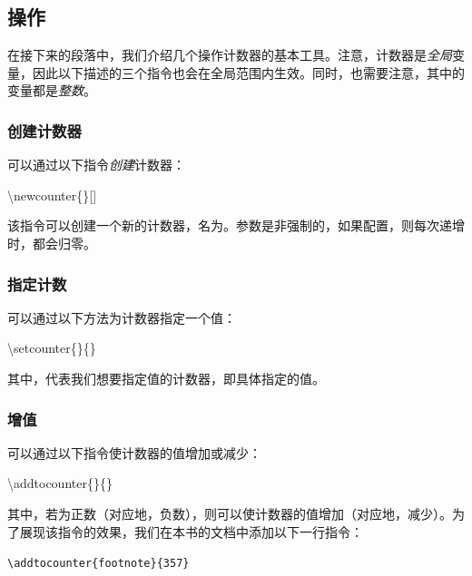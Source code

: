 \subsection{操作}

在接下来的段落中，我们介绍几个操作计数器的基本工具。注意，计数器是\emph{全局}变量，因此以下描述的三个指令也会在全局范围内生效。同时，也需要注意，其中的变量都是\emph{整数}。

\subsubsection{创建计数器}

可以通过以下指令\emph{创建}计数器：

\begin{dmd}
\backslash newcounter\{\}[]
\end{dmd}

该指令可以创建一个新的计数器，名为。参数是非强制的，如果配置，则每次递增时，都会归零。

\subsubsection{指定计数}

可以通过以下方法为计数器指定一个值：

\begin{dmd}
\backslash setcounter\{\}\{\}
\end{dmd}

其中，代表我们想要指定值的计数器，即具体指定的值。

\subsubsection{增值}

可以通过以下指令使计数器的值增加或减少：

\begin{dmd}
  \backslash addtocounter\{\}\{\}
\end{dmd}

其中，若为正数（对应地，负数），则可以使计数器的值增加（对应地，减少）。为了展现该指令的效果，我们在本书的文档中添加以下一行指令：

\begin{dmd}
\verb|\addtocounter{footnote}{357}|
\end{dmd}

